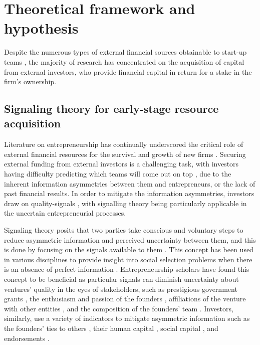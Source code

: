 \documentclass[12pt]{article}
\begin{document}
\section{Theoretical framework and hypothesis}

Despite the numerous types of external financial sources obtainable to start-up teams \citep{drover2017review, klein2020start}, the majority of research has concentrated on the acquisition of capital from external investors, who provide financial capital in return for a stake in the firm's ownership.

\subsection{Signaling theory for early-stage resource acquisition}

Literature on entrepreneurship has continually underscored the critical role of external financial resources for the survival and growth of new firms \citep{cooper1994initial}. Securing external funding from external investors is a challenging task, with investors having difficulty predicting which teams will come out on top \citep{ghassemiautomated}, due to the inherent information asymmetries between them and entrepreneurs, or the lack of past financial results. In order to mitigate the information asymmetries, investors draw on quality-signals \citep{ko2018signaling, spence1978job, subramanian2022backing}, with signalling theory being particularly applicable in the uncertain entrepreneurial processes.

Signaling theory posits that two parties take conscious and voluntary steps to reduce asymmetric information and perceived uncertainty between them, and this is done by focusing on the signals available to them \citep{spence1974market}. This concept has been used in various disciplines to provide insight into social selection problems when there is an absence of perfect information \citep{connelly2011signaling, colombo2021use}. Entrepreneurship scholars have found this concept to be beneficial as particular signals can diminish uncertainty about ventures' quality in the eyes of stakeholders, such as prestigious government grants \citep{islam2018signaling}, the enthusiasm and passion of the founders \citep{chen2009entrepreneur}, affiliations of the venture with other entities \citep{plummer2016better}, and the composition of the founders' team \citep{ko2018signaling}. Investors, similarly, use a variety of indicators to mitigate asymmetric information such as the founders' ties to others \citep{shane2002network}, their human capital \citep{beckman2007early}, social capital \citep{shane2002organizational}, and endorsements \citep{courtney2017resolving, janney2006moderating, plummer2016better}.
\end{document}

